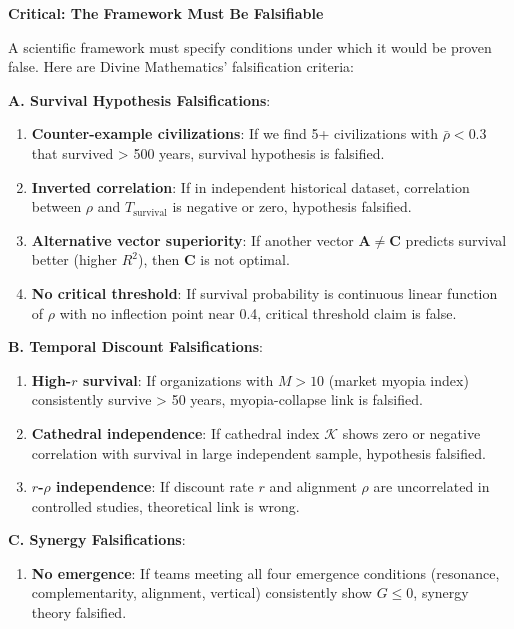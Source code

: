 \documentclass[11pt,a4paper]{article}
\theoremstyle{definition}
\theoremstyle{remark}
\begin{document}
\begin{enumerate}
\begin{mdframed}[backgroundcolor=red!10,linewidth=2pt,linecolor=red!70!black]
\textbf{Critical: The Framework Must Be Falsifiable}

A scientific framework must specify conditions under which it would be proven false. Here are Divine Mathematics' falsification criteria:

\textbf{A. Survival Hypothesis Falsifications}:
\begin{enumerate}
    \item \textbf{Counter-example civilizations}: If we find 5+ civilizations with \(\bar{\rho} < 0.3\) that survived > 500 years, survival hypothesis is falsified.
    
    \item \textbf{Inverted correlation}: If in independent historical dataset, correlation between \(\rho\) and \(T_{\text{survival}}\) is negative or zero, hypothesis falsified.
    
    \item \textbf{Alternative vector superiority}: If another vector \(\mathbf{A} \neq \mathbf{C}\) predicts survival better (higher \(R^2\)), then \(\mathbf{C}\) is not optimal.
    
    \item \textbf{No critical threshold}: If survival probability is continuous linear function of \(\rho\) with no inflection point near 0.4, critical threshold claim is false.
\end{enumerate}

\textbf{B. Temporal Discount Falsifications}:
\begin{enumerate}
    \item \textbf{High-\(r\) survival}: If organizations with \(M > 10\) (market myopia index) consistently survive > 50 years, myopia-collapse link is falsified.
    
    \item \textbf{Cathedral independence}: If cathedral index \(\mathcal{K}\) shows zero or negative correlation with survival in large independent sample, hypothesis falsified.
    
    \item \textbf{\(r\)-\(\rho\) independence}: If discount rate \(r\) and alignment \(\rho\) are uncorrelated in controlled studies, theoretical link is wrong.
\end{enumerate}

\textbf{C. Synergy Falsifications}:
\begin{enumerate}
    \item \textbf{No emergence}: If teams meeting all four emergence conditions (resonance, complementarity, alignment, vertical) consistently show \(G \leq 0\), synergy theory falsified.
    

\end{enumerate}
\end{mdframed}
\end{enumerate}
\end{document}
